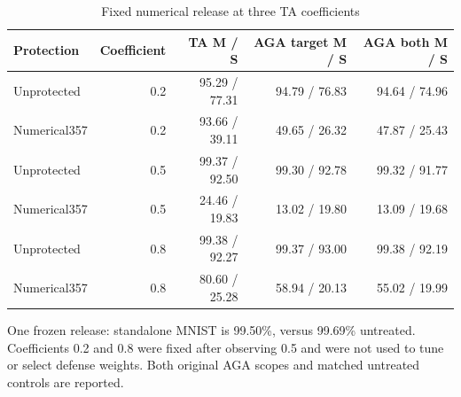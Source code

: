 \begin{table}[!htbp]
\centering
\small
\caption{Fixed numerical release at three TA coefficients}
\label{tab:numerical_coefficient}
\begin{tabular}{lrrrr}
\toprule
Protection & Coefficient & TA M / S & AGA target M / S & AGA both M / S \\
\midrule
Unprotected & 0.2 & 95.29 / 77.31 & 94.79 / 76.83 & 94.64 / 74.96 \\
Numerical357 & 0.2 & 93.66 / 39.11 & 49.65 / 26.32 & 47.87 / 25.43 \\
Unprotected & 0.5 & 99.37 / 92.50 & 99.30 / 92.78 & 99.32 / 91.77 \\
Numerical357 & 0.5 & 24.46 / 19.83 & 13.02 / 19.80 & 13.09 / 19.68 \\
Unprotected & 0.8 & 99.38 / 92.27 & 99.37 / 93.00 & 99.38 / 92.19 \\
Numerical357 & 0.8 & 80.60 / 25.28 & 58.94 / 20.13 & 55.02 / 19.99 \\
\bottomrule
\end{tabular}
\par\vspace{3pt}\begin{minipage}{0.98\linewidth}\footnotesize One frozen release: standalone MNIST is 99.50\%, versus 99.69\% untreated. Coefficients 0.2 and 0.8 were fixed after observing 0.5 and were not used to tune or select defense weights. Both original AGA scopes and matched untreated controls are reported.\end{minipage}
\end{table}

